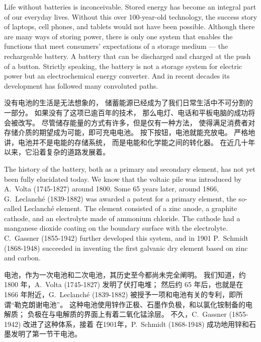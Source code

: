 \begin{translation}
    Life without batteries is inconceivable. 
    Stored energy has become an integral part of our everyday lives. 
    Without this over 100-year-old technology, 
    the success story of laptops, cell phones, 
    and tablets would not have been possible. 
    Although there are many ways of storing power, 
    there is only one system that enables the functions 
    that meet consumers' expectations 
    of a storage medium --- the rechargeable battery. 
    A battery that can be discharged and charged at the push of a button. 
    Strictly speaking, the battery is not a storage system for electric power 
    but an electrochemical energy converter. 
    And in recent decades its development has followed many convoluted paths.

    没有电池的生活是无法想象的，
    储蓄能源已经成为了我们日常生活中不可分割的一部分。
    如果没有了这项已逾百年的技术，
    那么电灯、电话和平板电脑的成功将会被改写。
    尽管储存能量的方式有许多，但是仅有一种方法，
    使得满足消费者对存储介质的期望成为可能，即可充电电池。
    按下按钮，电池就能充放电。
    严格地讲，电池并不是电能的存储系统，
    而是电能和化学能之间的转化器。
    在近几十年以来，它沿着复杂的道路发展着。
    
    The history of the battery, both as a primary and secondary element, 
    has not yet been fully elucidated today. 
    We know that the voltaic pile was introduced by A.~Volta (1745-1827) around 1800. 
    Some 65 years later, around 1866, G.~Leclanché (1839-1882) was 
    awarded a patent for a primary element, the so-called Leclanché element. 
    The element consisted of a zinc anode, a graphite cathode, 
    and an electrolyte made of ammonium chloride. The cathode had a manganese dioxide 
    coating on the boundary surface with the electrolyte. 
    C.~Gassner (1855-1942) further developed this system, and in 1901 
    P.~Schmidt (1868-1948) succeeded in inventing the first galvanic dry element 
    based on zinc and carbon.
    
    电池，作为一次电池和二次电池，其历史至今都尚未完全阐明。
    我们知道，约 1800 年，A.~Volta (1745-1827) 发明了伏打电堆；
    然后约 65 年后，也就是在 1866 年附近，G.~Leclanché (1839-1882)
    被授予一项和电池有关的专利，即所谓“勒克朗谢电池”。
    这种电池使用锌作正极、石墨作负极，和以氯化铵制备的电解质；
    负极在与电解质的界面上有着二氧化锰涂层。
    不久，C.~Gassner (1855-1942) 改进了这种体系，接着
    在1901年，P.~Schmidt (1868-1948) 成功地用锌和石墨发明了第一节干电池。
    
\end{translation}
